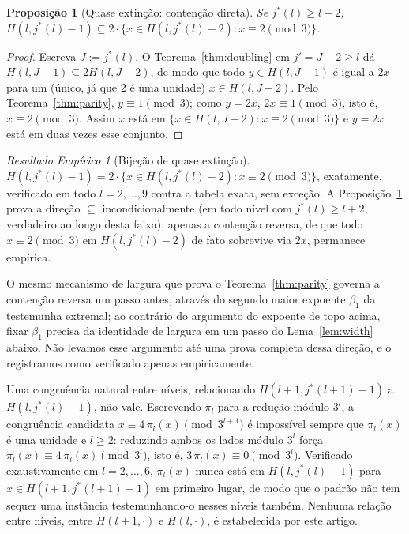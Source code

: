 \documentclass[11pt]{amsart}
\theoremstyle{plain}
\newtheorem{proposition}[theorem]{Proposi\c{c}\~ao}
\theoremstyle{definition}
\theoremstyle{remark}
\newtheorem{empresult}[theorem]{Resultado Emp\'irico}
\begin{document}
\begin{proposition}[Quase extinção: contenção direta]
\label{prop:extinctionfwd}
Se $j^*(l)\ge l+2$, $H(l,j^*(l)-1) \subseteq 2\cdot\{x \in H(l,j^*(l)-2) : x\equiv2\!\!\pmod3\}$.
\end{proposition}

\begin{proof}
Escreva $J:=j^*(l)$. O Teorema~\ref{thm:doubling} em $j'=J-2\ge l$ dá $H(l,J-1)\subseteq2H(l,J-2)$,
de modo que todo $y\in H(l,J-1)$ é igual a $2x$ para um (único, já que $2$ é uma unidade)
$x\in H(l,J-2)$. Pelo Teorema~\ref{thm:parity}, $y\equiv1\pmod3$; como $y=2x$, $2x\equiv1\pmod3$,
isto é, $x\equiv2\pmod3$. Assim $x$ está em $\{x\in H(l,J-2):x\equiv2\pmod3\}$ e $y=2x$ está em duas
vezes esse conjunto.
\end{proof}

\begin{empresult}[Bijeção de quase extinção]
\label{er:extinction}
$H(l,j^*(l)-1) = 2\cdot\{x \in H(l,j^*(l)-2) : x\equiv2\!\!\pmod3\}$, exatamente, verificado em
todo $l=2,\dots,9$ contra a tabela exata, sem exceção. A Proposição~\ref{prop:extinctionfwd} prova
a direção $\subseteq$ incondicionalmente (em todo nível com $j^*(l)\ge l+2$, verdadeiro ao longo
desta faixa); apenas a contenção reversa, de que todo $x\equiv2\pmod3$ em $H(l,j^*(l)-2)$ de fato
sobrevive via $2x$, permanece empírica.
\end{empresult}

O mesmo mecanismo de largura que prova o Teorema~\ref{thm:parity} governa a contenção reversa um
passo antes, através do segundo maior expoente $\beta_1$ da testemunha extremal; ao contrário do
argumento do expoente de topo acima, fixar $\beta_1$ precisa da identidade de largura em um passo
do Lema~\ref{lem:width} abaixo. Não levamos esse argumento até uma prova completa dessa direção, e
o registramos como verificado apenas empiricamente.

Uma congruência natural entre níveis, relacionando $H(l+1,j^*(l+1)-1)$ a $H(l,j^*(l)-1)$, não vale.
Escrevendo $\pi_l$ para a redução módulo $3^l$, a congruência candidata
$x\equiv4\,\pi_l(x)\pmod{3^{l+1}}$ é impossível sempre que $\pi_l(x)$ é uma unidade e $l\ge2$:
reduzindo ambos os lados módulo $3^l$ força $\pi_l(x)\equiv4\,\pi_l(x)\pmod{3^l}$, isto é,
$3\,\pi_l(x)\equiv0\pmod{3^l}$. Verificado exaustivamente em $l=2,\dots,6$, $\pi_l(x)$ nunca está
em $H(l,j^*(l)-1)$ para $x\in H(l+1,j^*(l+1)-1)$ em primeiro lugar, de modo que o padrão não tem
sequer uma instância testemunhando-o nesses níveis também. Nenhuma relação entre níveis, entre
$H(l+1,\cdot)$ e $H(l,\cdot)$, é estabelecida por este artigo.
\end{document}
